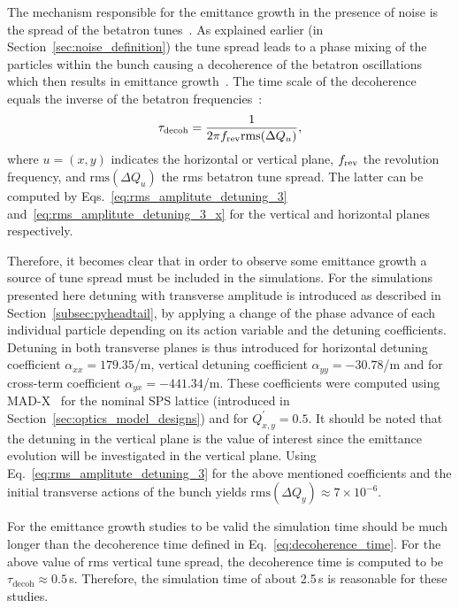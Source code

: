 The mechanism responsible for the emittance growth in the presence of noise is the spread of the betatron tunes~\cite{Lebedev:248620}. As explained earlier (in Section~\ref{sec:noise_definition}) the tune spread leads to a phase mixing of the particles within the bunch causing a decoherence of the betatron oscillations which then results in emittance growth~\cite{Lebedev:248620}. The time scale of the decoherence equals the inverse of the betatron frequencies~\cite{Lebedev:248620}: %
\begin{equation}\label{eq:decoherence_time}
    \tau_\mathrm{decoh} = \frac{1}{2\pi {f_\mathrm{rev}} \mathrm{rms}(\Delta Q_u)},
\end{equation}
where $u=(x,y)$ indicates the horizontal or vertical plane, ${f_\mathrm{rev}}$ the revolution frequency, and $\mathrm{rms}(\Delta Q_u)$ the rms betatron tune spread. The latter can be computed by Eqs.~\eqref{eq:rms_amplitute_detuning_3} and~\eqref{eq:rms_amplitute_detuning_3_x} for the vertical and horizontal planes respectively.

Therefore, it becomes clear that in order to observe some emittance growth a source of tune spread must be included in the simulations. For the simulations presented here detuning with transverse amplitude is introduced as described in Section~\ref{subsec:pyheadtail}, by applying a change of the phase advance of each individual particle depending on its action variable and the detuning coefficients. Detuning in both transverse planes is thus introduced for horizontal detuning coefficient $\alpha_{xx}=179.35$/m, vertical detuning coefficient $\alpha_{yy}=-30.78$/m and for cross-term coefficient $\alpha_{yx}=-441.34$/m. These coefficients were computed using MAD-X~\cite{madx} for the nominal SPS lattice (introduced in Section~\ref{sec:optics_model_designs}) and for $Q^\prime_{x,y}=0.5$. It should be noted that the detuning in the vertical plane is the value of interest since the emittance evolution will be investigated in the vertical plane. Using Eq.~\eqref{eq:rms_amplitute_detuning_3} for the above mentioned coefficients and the initial transverse actions of the bunch yields $\mathrm{rms}(\Delta Q_y)\approx 7 \times 10^{-6}$. 

For the emittance growth studies to be valid the simulation time should be much longer than the decoherence time defined in Eq.~\eqref{eq:decoherence_time}. For the above value of rms vertical tune spread, the decoherence time is computed to be $\tau_\mathrm{decoh} \approx 0.5$\,s. Therefore, the simulation time of about 2.5\,s is reasonable for these studies.


